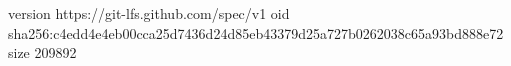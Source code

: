 version https://git-lfs.github.com/spec/v1
oid sha256:c4edd4e4eb00cca25d7436d24d85eb43379d25a727b0262038c65a93bd888e72
size 209892
